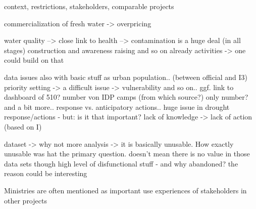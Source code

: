 % 












context, restrictions, stakeholders, comparable projects

commercialization of fresh water -> overpricing

water quality --> close link to health
--> contamination is a huge deal (in all stages) construction and awareness raising and so on already activities -> one could build on that

data issues also with basic stuff as urban population.. (between official and I3)
priority setting -> a difficult issue -> vulnerability and so on.. ggf. link to dashboard of 510?
number von IDP camps (from which source?) only number? and a bit more..
response vs. anticipatory actions.. huge issue in drought response/actions - but: is it that important?
lack of knowledge -> lack of action (based on I)


dataset -> why not more analysis -> it is basically unusable. How exactly unusable was hat the primary question. doesn't mean there is no value in those data sets though
high level of disfunctional stuff - and why abandoned? the reason could be interesting

Ministries are often mentioned as important
use experiences of stakeholders in other projects

